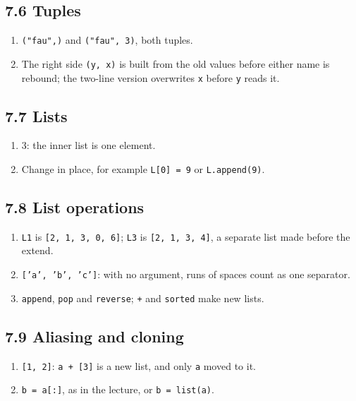 \documentclass[11pt]{article}
\begin{document}
\begin{keepsection}\subsection{7.6 Tuples}

\begin{enumerate}
\item \texttt{("fau",)} and \texttt{("fau", 3)}, both tuples.
\item The right side \texttt{(y, x)} is built from the old values before either name is rebound; the two-line version overwrites \texttt{x} before \texttt{y} reads it.
\end{enumerate}

\end{keepsection}
\begin{keepsection}\subsection{7.7 Lists}

\begin{enumerate}
\item 3: the inner list is one element.
\item Change in place, for example \texttt{L[0] = 9} or \texttt{L.append(9)}.
\end{enumerate}

\end{keepsection}
\begin{keepsection}\subsection{7.8 List operations}

\begin{enumerate}
\item \texttt{L1} is \texttt{[2, 1, 3, 0, 6]}; \texttt{L3} is \texttt{[2, 1, 3, 4]}, a separate list made before the extend.
\item \texttt{['a', 'b', 'c']}: with no argument, runs of spaces count as one separator.
\item \texttt{append}, \texttt{pop} and \texttt{reverse}; \texttt{+} and \texttt{sorted} make new lists.
\end{enumerate}

\end{keepsection}
\begin{keepsection}\subsection{7.9 Aliasing and cloning}

\begin{enumerate}
\item \texttt{[1, 2]}: \texttt{a + [3]} is a new list, and only \texttt{a} moved to it.
\item \texttt{b = a[:]}, as in the lecture, or \texttt{b = list(a)}.
\end{enumerate}

\end{keepsection}
\end{document}
